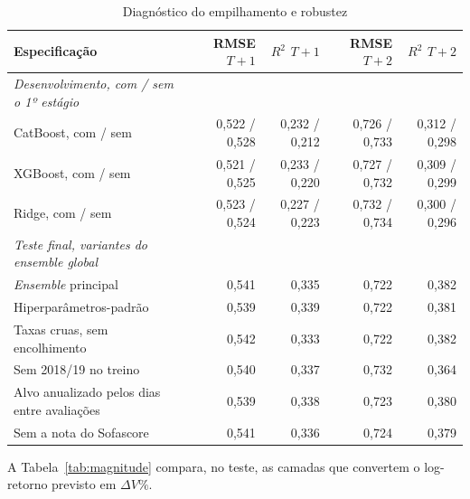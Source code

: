 \documentclass[article, 12pt, oneside, a4paper, english, brazil, section=TITLE]{abntex2}
\begin{document}
\begin{table}[htbp]
  \caption{Diagnóstico do empilhamento e robustez}
  \label{tab:robustez}
  \begin{tabularx}{\textwidth}{Lrrrr}
    \toprule
    Especificação & RMSE $T+1$ & $R^2$ $T+1$ & RMSE $T+2$ & $R^2$ $T+2$ \\
    \midrule
    \textit{Desenvolvimento, com / sem o 1º estágio} & & & & \\
    CatBoost, com / sem & 0,522 / 0,528 & 0,232 / 0,212 & 0,726 / 0,733 & 0,312 / 0,298 \\
    XGBoost, com / sem & 0,521 / 0,525 & 0,233 / 0,220 & 0,727 / 0,732 & 0,309 / 0,299 \\
    Ridge, com / sem & 0,523 / 0,524 & 0,227 / 0,223 & 0,732 / 0,734 & 0,300 / 0,296 \\
    \midrule
    \textit{Teste final, variantes do ensemble global} & & & & \\
    \textit{Ensemble} principal & 0,541 & 0,335 & 0,722 & 0,382 \\
    Hiperparâmetros-padrão & 0,539 & 0,339 & 0,722 & 0,381 \\
    Taxas cruas, sem encolhimento & 0,542 & 0,333 & 0,722 & 0,382 \\
    Sem 2018/19 no treino & 0,540 & 0,337 & 0,732 & 0,364 \\
    Alvo anualizado pelos dias entre avaliações & 0,539 & 0,338 & 0,723 & 0,380 \\
    Sem a nota do Sofascore & 0,541 & 0,336 & 0,724 & 0,379 \\
    \bottomrule
  \end{tabularx}
\end{table}

\label{ap:magnitude}

A Tabela~\ref{tab:magnitude} compara, no teste, as camadas que convertem o log-retorno previsto em $\Delta V\%$.
\end{document}
